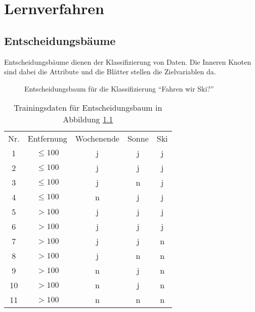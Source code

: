 \chapter{Lernverfahren}
\section{Entscheidungsbäume}
Entscheidungsbäume dienen der Klassifizierung von Daten.
Die Inneren Knoten sind dabei die Attribute und die Blätter stellen die Zielvariablen da.
\begin{figure}[htbp]
	\centering
	\caption{Entscheidungsbaum für die Klassifizierung ``Fahren wir Ski?''}
	\label{fig:EntscheidungsbaumBsp}
\end{figure}
\begin{table}[htbp]
	\centering
	\begin{tabular}{ccccc}
		Nr. & Entfernung & Wochenende & Sonne & Ski\\
		1 & \(\leq 100\) & j & j & j\\
		2 & \(\leq 100\) & j & j & j\\
		3 & \(\leq 100\) & j & n & j\\
		4 & \(\leq 100\) & n & j & j\\
		5 & \(>100\) & j & j & j\\
		6 & \(>100\) & j & j & j\\
		7 & \(>100\) & j & j & n\\
		8 & \(>100\) & j & n & n\\
		9 & \(>100\) & n & j & n\\
		10 & \(>100\) & n & j & n\\
		11 & \(>100\) & n & n & n
	\end{tabular}
	\caption{Trainingsdaten für Entscheidungsbaum in Abbildung \ref{fig:EntscheidungsbaumBsp}}
\end{table}

